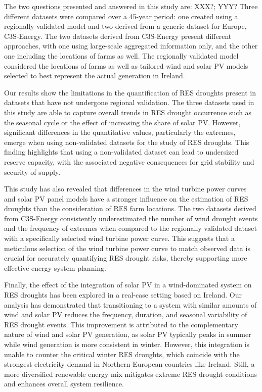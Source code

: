 \documentclass[preprint, 12pt]{elsarticle}
\begin{document}
The two questions presented and answered in this study are: XXX?; YYY? Three different datasets were compared over a 45-year period: one created using a regionally validated model and two derived from a generic dataset for Europe, C3S-Energy. The two datasets derived from C3S-Energy present different approaches, with one using large-scale aggregated information only, and the other one including the locations of farms as well. The regionally validated model considered the locations of farms as well as tailored wind and solar PV models selected to best represent the actual generation in Ireland.

Our results show the limitations in the quantification of RES droughts present in datasets that have not undergone regional validation. The three datasets used in this study are able to capture overall trends in RES drought occurrence such as the seasonal cycle or the effect of increasing the share of solar PV. However, significant differences in the quantitative values, particularly the extremes, emerge when using non-validated datasets for the study of RES droughts. This finding highlights that using a non-validated dataset can lead to undersized reserve capacity, with the associated negative consequences for grid stability and security of supply.

This study has also revealed that differences in the wind turbine power curves and solar PV panel models have a stronger influence on the estimation of RES droughts than the consideration of RES farm locations. The two datasets derived from C3S-Energy consistently underestimated the number of wind drought events and the frequency of extremes when compared to the regionally validated dataset with a specifically selected wind turbine power curve. This suggests that a meticulous selection of the wind turbine power curve to match observed data is crucial for accurately quantifying RES drought risks, thereby supporting more effective energy system planning.

Finally, the effect of the integration of solar PV in a wind-dominated system on RES droughts has been explored in a real-case setting based on Ireland. Our analysis has demonstrated that transitioning to a system with similar amounts of wind and solar PV reduces the frequency, duration, and seasonal variability of RES drought events. This improvement is attributed to the complementary nature of wind and solar PV generation, as solar PV typically peaks in summer while wind generation is more consistent in winter. However, this integration is unable to counter the critical winter RES droughts, which coincide with the strongest electricity demand in Northern European countries like Ireland. Still, a more diversified renewable energy mix mitigates extreme RES drought conditions and enhances overall system resilience.
\end{document}
